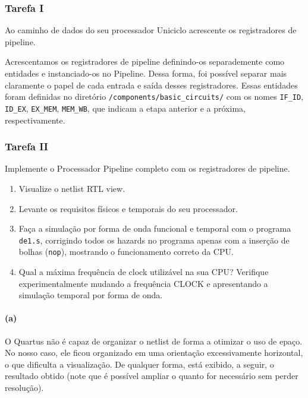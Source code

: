 \documentclass[a4paper,12pt]{article}
\newcommand{\cod}[1]{\texttt{#1}}
\begin{document}
\subsubsection{Tarefa I}
\begin{tcolorbox}[title=Enunciado, colback=blue!5!white, colframe=blue!75!black]

    Ao caminho de dados do seu processador Uniciclo acrescente os registradores de pipeline.

\end{tcolorbox}

Acrescentamos os registradores de pipeline definindo-os separademente como entidades e instanciado-os no Pipeline. Dessa forma, foi possível separar mais claramente o papel de cada entrada e saída desses registradores. Essas entidades foram definidas no diretório \cod{/components/basic\_circuits/} com os nomes \cod{IF\_ID}, \cod{ID\_EX}, \cod{EX\_MEM}, \cod{MEM\_WB}, que indicam a etapa anterior e a próxima, respectivamente.


\subsubsection{Tarefa II}
\begin{tcolorbox}[title=Enunciado, colback=blue!5!white, colframe=blue!75!black]
    Implemente o Processador Pipeline completo com os registradores de pipeline.
    \begin{enumerate}[label=(\alph*)]
        \item Visualize o netlist RTL view.
        \item Levante os requisitos físicos e temporais do seu processador.
        \item Faça a simulação por forma de onda funcional e temporal com o programa \cod{de1.s}, corrigindo todos os hazards no programa apenas com a inserção de bolhas (\cod{nop}), mostrando o funcionamento correto da CPU. 
        \item Qual a máxima frequência de clock utilizável na sua CPU? Verifique experimentalmente mudando a frequência CLOCK e apresentando a simulação temporal por forma de onda. 
    \end{enumerate}

\end{tcolorbox}

\paragraph{(a)} O Quartus não é capaz de organizar o netlist de forma a otimizar o uso de epaço. No nosso caso, ele ficou organizado em uma orientação excessivamente horizontal, o que dificulta a visualização. De qualquer forma, está exibido, a seguir, o resultado obtido (note que é possível ampliar o quanto for necessário sem perder resolução).
\end{document}
